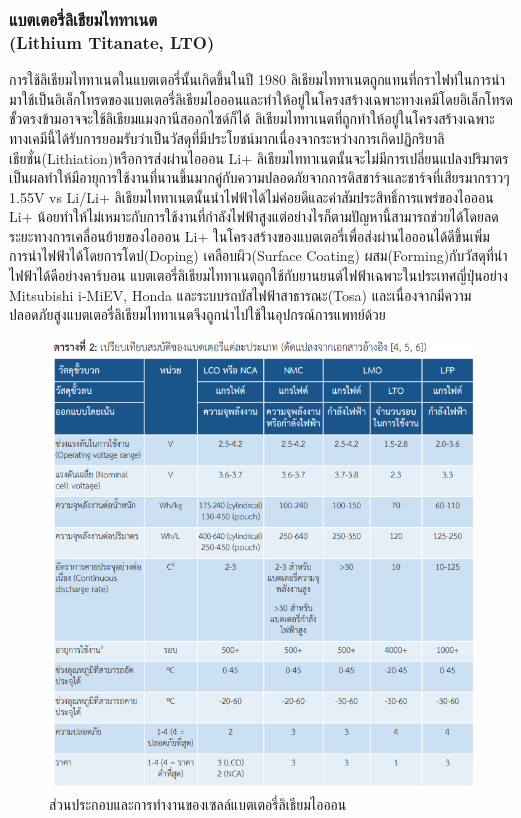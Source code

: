 \subsubsection*{แบตเตอรี่ลิเธียมไททาเนต\\ (Lithium Titanate, LTO)}
	การใช้ลิเธียมไททาเนตในแบตเตอรี่นั้นเกิดขึ้นในปี 1980 ลิเธียมไททาเนตถูกแทนที่กราไฟท์ในการนำมาใช้เป็นอิเล็กโทรดของแบตเตอรี่ลิเธียมไอออนและทำให้อยู่ในโครงสร้างเฉพาะทางเคมีโดยอิเล็กโทรดขั้วตรงข้ามอาจจะใช้ลิเธียมแมงกานีสออกไซด์ก็ได้ ลิเธียมไททาเนตที่ถูกทำให้อยู่ในโครงสร้างเฉพาะทางเคมีนี้ได้รับการยอมรับว่าเป็นวัสดุที่มีประโยชน์มากเนื่องจากระหว่างการเกิดปฏิกริยาลิเธียชั่น(Lithiation)หรือการส่งผ่านไอออน Li+ ลิเธียมไททาเนตนั้นจะไม่มีการเปลี่ยนแปลงปริมาตรเป็นผลทำให้มีอายุการใช้งานที่นานขึ้นมากคู่กับความปลอดภัยจากการดิสชาร์จและชาร์จที่เสียรมากราวๆ 1.55V vs Li/Li+ ลิเธียมไททาเนตนั้นนำไฟฟ้าได้ไม่ค่อยดีและค่าสัมประสิทธิ์การแพร่ของไอออน Li+ น้อยทำให้ไม่เหมาะกับการใช้งานที่กำลังไฟฟ้าสูงแต่อย่างไรก็ตามปัญหานี้สามารถช่วยได้โดยลดระยะทางการเคลื่อนย้ายของไอออน Li+ ในโครงสร้างของแบตเตอรี่เพื่อส่งผ่านไอออนได้ดีขึ้นเพิ่มการนำไฟฟ้าได้โดยการโดป(Doping) เคลือบผิว(Surface Coating) ผสม(Forming)กับวัสดุที่นำไฟฟ้าได้ดีอย่างคาร์บอน
	\newline แบตเตอรี่ลิเธียมไททาเนตถูกใช้กับยานยนต์ไฟฟ้าเฉพาะในประเทศญี่ปุ่นอย่าง Mitsubishi i-MiEV, Honda และระบบรถบัสไฟฟ้าสาธารณะ(Tosa) และเนื่องจากมีความปลอดภัยสูงแบตเตอรี่ลิเธียมไททาเนตจึงถูกนำไปใช้ในอุปกรณ์การแพทย์ด้วย
\begin{center}
	\begin{figure}[!h]
		\includegraphics[width=0.6\linewidth]{Chapters/img/Compare_Spec_Batteries.png}
			\centering
			\captionsetup{justification=centering,margin=2cm}
			\caption{ส่วนประกอบและการทำงานของเซลล์แบตเตอรี่ลิเธียมไอออน}
	\end{figure}
\end{center}
